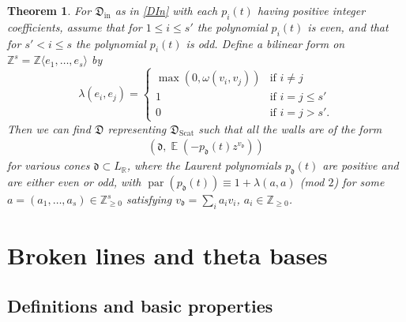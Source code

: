 \documentclass{amsart}
\DeclareMathOperator{\parit}{par}
\DeclareMathOperator{\In}{in}
\DeclareMathOperator{\EE}{\mathbb{E}}
\DeclareMathOperator{\scat}{Scat}
\let\bb=\mathbb
\let\f=\mathfrak
\theoremstyle{plain}%
\newtheorem{thm}{Theorem}[section]
\theoremstyle{definition}
\theoremstyle{remark}
\begin{document}
\begin{thm}
\label{parity_cor}
For $\f{D}_{\In}$ as in \eqref{DIn} with each $p_i(t)$ having positive integer coefficients, assume that for $1\leq i\leq s'$ the polynomial $p_i(t)$ is even, and that for $s'<i\leq s$ the polynomial $p_i(t)$ is odd.  Define a bilinear form on $\mathbb{Z}^s=\bb{Z}\langle e_1,\ldots,e_s\rangle$ by
\begin{equation}\label{lambda_def}
\lambda(e_i,e_j)=\begin{cases} \max(0,\omega(v_i,v_j)) &\textrm{if~}i\neq j\\
1 &\textrm{if~}i=j\leq s'\\
0&\textrm{if~}i=j>s'.
\end{cases}
\end{equation}
Then we can find $\f{D}$ representing $\f{D}_{\scat}$ such that all the walls are of the form 
\begin{align}
\label{wall_parities}
(\f{d},\EE(-p_{\f{d}}(t)z^{v_{\f{d}}}))
\end{align}
for various cones $\f{d}\subset L_{\mathbb{R}}$, where the Laurent polynomials $p_{\f{d}}(t)$ are positive and are either even or odd, with $\parit(p_{\f{d}}(t))\equiv 1+\lambda(a,a)$ (mod $2$) for some $a=(a_1,\ldots,a_s)\in \bb{Z}_{\geq 0}^s$ satisfying $v_{\f{d}}=\sum_i a_i v_i$, $a_i\in \mathbb{Z}_{\geq 0}$. 
\end{thm}



\section{Broken lines and theta bases}\label{BrokenLines}
\label{theta_sec}

\subsection{Definitions and basic properties}\label{theta-def}
\end{document}
